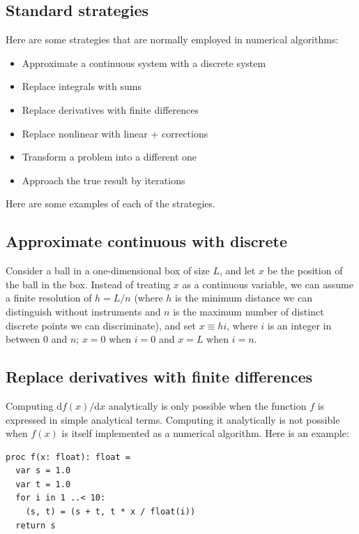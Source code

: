 \documentclass[justified, sixbynine]{tufte-book}
\theoremstyle{plain}%
\newtheorem * {corollary}{Corollary}
\theoremstyle{definition}
\theoremstyle{remark}
\newtheorem * {remark}{Remark}
\newtheorem * {note}{Note}
\begin{document}
\begin{fullwidth}
\goodbreak\section{Standard strategies}

Here are some strategies that are normally employed in numerical algorithms:

\begin{itemize}
\item Approximate a continuous system with a discrete system
\item Replace integrals with sums
\item Replace derivatives with finite differences
\item Replace nonlinear with linear + corrections
\item Transform a problem into a different one
\item Approach the true result by iterations
\end{itemize}

Here are some examples of each of the strategies.

\goodbreak\subsection{Approximate continuous with discrete}

Consider a ball in a one-dimensional box of size $L$, and let $x$ be the position of the ball in the box. Instead of treating $x$ as a continuous variable, we can assume a finite resolution of $h = L/n$ (where $h$ is the minimum distance we can distinguish without instruments and $n$ is the maximum number of distinct discrete points we can discriminate), and set $x \equiv h i$, where $i$ is an integer in between $0$ and $n$; $x=0$ when $i=0$ and $x=L$ when $i=n$.

\goodbreak\subsection{Replace derivatives with finite differences}


Computing $\textrm{d}f(x)/\textrm{d}x$ analytically is only possible when the function $f$ is expressed in simple analytical terms. Computing it analytically is not possible when $f(x)$ is itself implemented as a numerical algorithm. Here is an example:

\begin{lstlisting}
proc f(x: float): float =
  var s = 1.0
  var t = 1.0
  for i in 1 ..< 10:
    (s, t) = (s + t, t * x / float(i))
  return s
\end{lstlisting}


\end{fullwidth}
\end{document}
